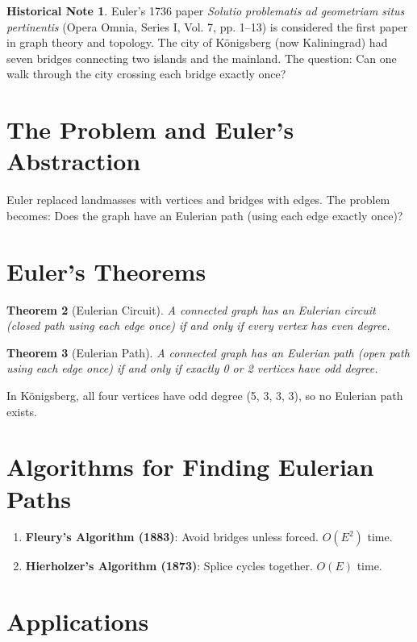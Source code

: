 \documentclass[11pt,a4paper,twoside]{book}
\theoremstyle{eulerstyle}
\newtheorem{theorem}{Theorem}[chapter]
\theoremstyle{definition}
\newtheorem{historical}[theorem]{Historical Note}
\begin{document}
\begin{historical}
Euler's 1736 paper \emph{Solutio problematis ad geometriam situs pertinentis} (Opera Omnia, Series I, Vol. 7, pp. 1--13) is considered the first paper in graph theory and topology. The city of Königsberg (now Kaliningrad) had seven bridges connecting two islands and the mainland. The question: Can one walk through the city crossing each bridge exactly once? \cite{euler1736}\end{historical}

\section{The Problem and Euler's Abstraction}

Euler replaced landmasses with vertices and bridges with edges. The problem becomes: Does the graph have an Eulerian path (using each edge exactly once)?

\section{Euler's Theorems}

\begin{theorem}[Eulerian Circuit]
A connected graph has an Eulerian circuit (closed path using each edge once) if and only if every vertex has even degree.
\end{theorem}

\begin{theorem}[Eulerian Path]
A connected graph has an Eulerian path (open path using each edge once) if and only if exactly 0 or 2 vertices have odd degree.
\end{theorem}

In Königsberg, all four vertices have odd degree (5, 3, 3, 3), so no Eulerian path exists.

\section{Algorithms for Finding Eulerian Paths}

\begin{enumerate}
    \item \textbf{Fleury's Algorithm (1883)}: Avoid bridges unless forced. $O(E^2)$ time.
    \item \textbf{Hierholzer's Algorithm (1873)}: Splice cycles together. $O(E)$ time.
\end{enumerate}

\section{Applications}
\end{document}
